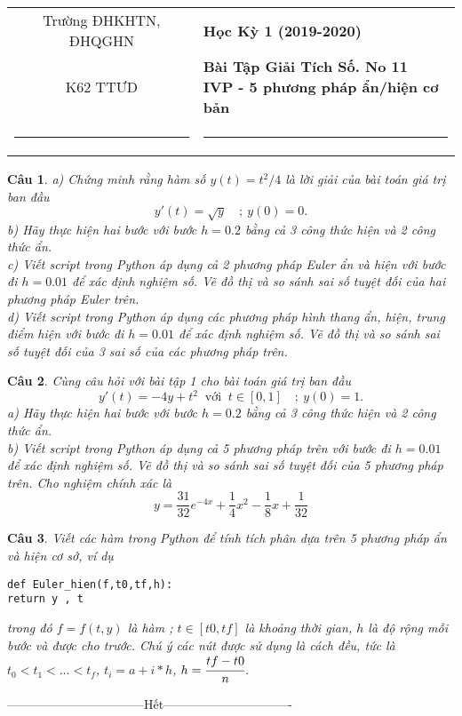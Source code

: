 \documentclass[11pt]{article}
\newtheorem{bt}{Câu}
\begin{document}
\begin{tabular*}
{\linewidth}{c>{\centering\hspace{0pt}} p{}}
Trường ĐHKHTN, ĐHQGHN & {\bf Học Kỳ 1 (2019-2020)}
\tabularnewline
K62 TTƯD & {\bf Bài Tập Giải Tích Số. No 11 \\ IVP - 5 phương pháp ẩn/hiện cơ bản}
\tabularnewline
\rule{1in}{1pt}  \small  & \rule{2in}{1pt} %
\tabularnewline

\end{tabular*}
%

\begin{bt}
a) Chứng minh rằng hàm số $y(t) = t^2/4$ là lời giải của bài toán giá trị ban đầu
\begin{equation*}
y'(t) = \sqrt{y} \quad ; \  y(0) = 0. 
\end{equation*}
b) Hãy thực hiện hai bước với bước $h = 0.2$ bằng cả 3 công thức hiện và 2 công thức ẩn. \\
c) Viết script trong Python áp dụng cả 2 phương pháp Euler ẩn và hiện với bước đi $h = 0.01$ để xác định nghiệm số. Vẽ đồ thị và so sánh sai số tuyệt đối của hai phương pháp Euler trên. \\
d) Viết script trong Python áp dụng các phương pháp hình thang ẩn, hiện, trung điểm hiện với bước đi $h = 0.01$ để xác định nghiệm số. Vẽ đồ thị và so sánh sai số tuyệt đối của 3 sai số của các phương pháp trên.
\end{bt}

\begin{bt}
Cùng câu hỏi với bài tập 1 cho bài toán giá trị ban đầu
\begin{equation*}
y'(t) = - 4y + t^2  \ \mbox{ với } \ t\in [0,1] \quad ; \  y(0) = 1. 
\end{equation*}
a) Hãy thực hiện hai bước với bước $h = 0.2$ bằng cả 3 công thức hiện và 2 công thức ẩn. \\
b) Viết script trong Python áp dụng cả 5 phương pháp trên với bước đi $h = 0.01$ để xác định nghiệm số. Vẽ đồ thị và so sánh sai số tuyệt đối của 5 phương pháp trên.
Cho nghiệm chính xác là 
%
\[
y = \dfrac{31}{32} e^{-4x} + \dfrac{1}{4} x^2 - \dfrac{1}{8} x + \dfrac{1}{32}
\]
%
\end{bt}

\begin{bt} Viết các hàm trong Python để tính tích phân dựa trên 5 phương pháp ẩn và hiện cơ sở, ví dụ 
%
\begin{lstlisting}[frame=single] 
def Euler_hien(f,t0,tf,h):
return y , t
\end{lstlisting}
%	 
trong đó $f = f(t,y)$ là hàm \quad ; $t \in [t0,tf]$ là khoảng thời gian, $h$ là độ rộng mỗi bước và được cho trước. Chú ý các nút được sử dụng là cách đều, tức là $t_0<t_1<\dots<t_f$, $t_i = a+i*h$, $h=\cfrac{tf-t0}{n}$. 


\end{bt}

\centerline{———————————Hết——————————-}
\end{document}
